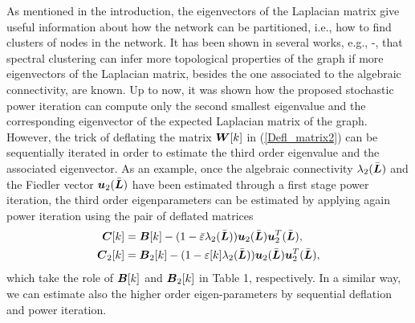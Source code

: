 \documentclass[10pt,twocolumn]{IEEEtran}
\def\bB{\mbox{\boldmath $B$}}
\def\bC{\mbox{\boldmath $C$}}
\def\bL{\mbox{\boldmath $L$}}
\def\bW{\mbox{\boldmath $W$}}
\def\bu{\mbox{\boldmath $u$}}
\begin{document}
 As mentioned in the introduction, the eigenvectors of the Laplacian matrix give useful information about how the network can be partitioned, i.e., how to find clusters of nodes in the network. It has been shown in several works, e.g., \cite{Bojan}-\cite{Hagen-Kaghn}, that spectral clustering can infer more topological properties of the graph if more eigenvectors of the Laplacian matrix, besides the one associated to the algebraic connectivity, are known. Up to now, it was shown how the proposed stochastic power iteration can compute only the second smallest eigenvalue and the corresponding eigenvector of the expected Laplacian matrix of the graph. However, the trick of deflating the matrix $\bW[k]$ in (\ref{Defl_matrix2}) can be sequentially iterated in order to estimate the third order eigenvalue and the associated eigenvector.
As an example, once the algebraic connectivity $\lambda_{2}(\bar{\bL})$ and the Fiedler vector $\bu_{2}(\bar{\bL})$ have been estimated through a first stage power iteration, the third order eigenparameters can be estimated by applying again power iteration using the pair of deflated matrices
\begin{align}
\bC[k]&=\bB[k]-(1-\bar{\varepsilon} \lambda_{2}(\bar{\bL}))\bu_{2}(\bar{\bL})\bu^T_{2}(\bar{\bL}),\nonumber\\
\bC_2[k]&=\bB_2[k]-(1-\varepsilon[k] \lambda_{2}(\bar{\bL}))\bu_{2}(\bar{\bL})\bu^T_{2}(\bar{\bL}), \nonumber
\end{align}
which take the role of $\bB[k]$ and $\bB_2[k]$ in Table 1, respectively. In a similar way, we can estimate also the higher order eigen-parameters by sequential deflation and power iteration.
\end{document}
